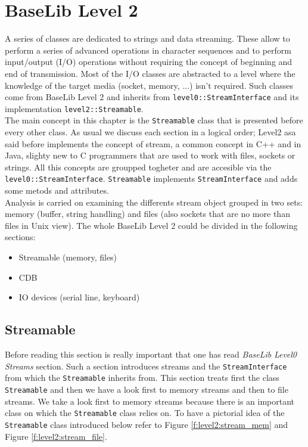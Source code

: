 \chapter{BaseLib Level 2}

A series of classes are dedicated to strings and data streaming. These allow to perform a series of advanced operations in character sequences and to perform input/output (I/O) operations without requiring the concept of beginning and end of transmission. Most of the I/O classes are abstracted to a level where the knowledge of the target media (socket, memory, ...) isn't required. Such classes come from BaseLib Level 2 and inherits from \texttt{level0::StreamInterface} and its implementation \texttt{level2::Streamable}.\\


The main concept in this chapter is the \texttt{Streamable} class that is presented before every other class.
As usual we discuss each section in a logical order; Level2 asa said before implements the concept of stream, a common concept in C++ and in Java, slighty new to C programmers that are used to work with files, sockets or strings. All this concepts are groupped togheter and are accesible via the \texttt{level0::StreamInterface}. \texttt{Streamable} implements \texttt{StreamInterface} and adds some metods and attributes.\\


Analysis is carried on examining the differents stream object grouped in two sets: memory (buffer, string handling) and files (also sockets that are no more than files in Unix view). The whole BaseLib Level 2 could be divided in the following sections:
\begin{itemize}
 \item Streamable (memory, files)
 \item CDB
 \item IO devices (serial line, keyboard)
\end{itemize}



\section{Streamable}
Before reading this section is really important that one has read \textit{BaseLib} \textit{Level0} \textit{Streams} section. Such a section introduces streams and the \texttt{StreamInterface} from which the \texttt{Streamable} inherits from. This section treats first the class \texttt{Streamable} and then we have a look first to memory streams and then to file streams. We take a look first to memory streams because there is an important class on which the \texttt{Streamable} class relies on. To have a pictorial idea of the \texttt{Streamable} class introduced below refer to Figure \ref{f:level2:stream_mem} and Figure \ref{f:level2:stream_file}.



